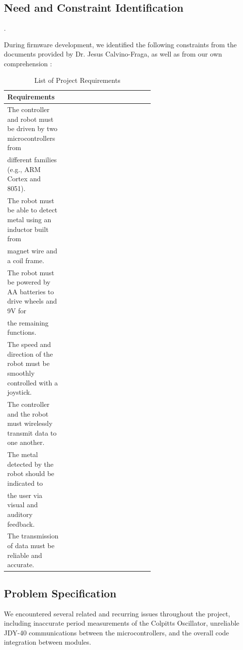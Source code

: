 \documentclass{article}
\begin{document}
\subsection{Need and Constraint Identification}.

During firmware development, we identified the following constraints from the
documents provided by Dr. Jesus Calvino-Fraga, as well as from our own comprehension : \\

\begin{table}[ht]
    \center
    \begin{tabular}{|l|p{0.6\linewidth}|}
        \hline
        \textbf{Requirements} \\ \hline
        The controller and robot must be driven by two microcontrollers from \\
        different families (e.g., ARM Cortex and 8051). \\ \hline
        The robot must be able to detect metal using an inductor built from \\
        magnet wire and a coil frame. \\ \hline
        The robot must be powered by AA batteries to drive wheels and 9V for \\
        the remaining functions. \\ \hline
        The speed and direction of the robot must be smoothly controlled with a joystick. \\ \hline
        The controller and the robot must wirelessly transmit data to one another. \\ \hline
        The metal detected by the robot should be indicated to \\
        the user via visual and auditory feedback. \\ \hline
        The transmission of data must be reliable and accurate. \\ \hline
    \end{tabular}
    \label{tab:project_requirements}
    \caption{List of Project Requirements}
\end{table}

\subsection{Problem Specification}

We encountered several related and recurring issues throughout the project, including inaccurate period measurements of the
Colpitts Oscillator, unreliable JDY-40 communications between the microcontrollers, and
the overall code integration between modules.
\end{document}
